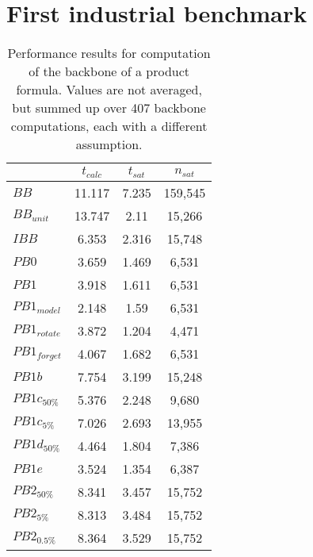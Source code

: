 \section{First industrial benchmark}
\label{sec:sectionVonThore}

\begin{table}[tbp]
\centering
\begin{tabular}{l| c c c }
&$t_{calc}$ & $t_{sat}$& $n_{sat}$ \\
\hline
$BB$ & 11.117 & 7.235 & 159,545 \\
$BB_{unit}$ & 13.747 & 2.11 & 15,266 \\
$IBB$ & 6.353 & 2.316 & 15,748 \\
$PB0$ & 3.659 & 1.469 & 6,531 \\
$PB1$ & 3.918 & 1.611 & 6,531 \\
$PB1_{model}$ & 2.148 & 1.59 & 6,531 \\
$PB1_{rotate}$ & 3.872 & 1.204 & 4,471 \\
$PB1_{forget}$ & 4.067 & 1.682 & 6,531 \\
$PB1b$ & 7.754 & 3.199 & 15,248 \\ %
$PB1c_{50\%}$ & 5.376 & 2.248 & 9,680 \\
$PB1c_{5\%}$ & 7.026 & 2.693 & 13,955 \\
$PB1d_{50\%}$ & 4.464 & 1.804 & 7,386 \\
$PB1e$ & 3.524 & 1.354 & 6,387 \\
$PB2_{50\%}$ & 8.341 & 3.457 & 15,752 \\
$PB2_{5\%}$ & 8.313 & 3.484 & 15,752 \\
$PB2_{0.5\%}$ & 8.364 & 3.529 & 15,752 \\
\end{tabular}
\caption[Performance results of first industrial benchmark]{Performance results for computation of the backbone of a product formula. Values are not averaged, but summed up over 407 backbone computations, each with a different assumption.}
\label{tab:vonThore1}
\end{table}

